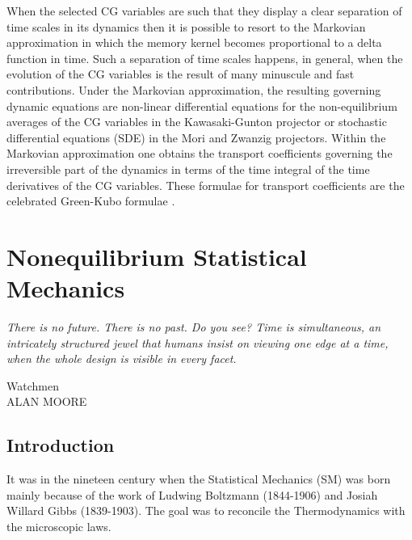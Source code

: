 \documentclass[a4paper,openright,12pt]{book}
\begin{document}
When the  selected CG  variables are  such that  they display  a clear
separation  of time  scales in  its dynamics  then it  is possible  to
resort  to the  Markovian  approximation in  which  the memory  kernel
becomes proportional to  a delta function in time.   Such a separation
of  time scales  happens, in  general, when  the evolution  of the  CG
variables  is the  result of  many minuscule  and fast  contributions.
Under  the Markovian  approximation, the  resulting governing  dynamic
equations    are   non-linear    differential   equations    for   the
non-equilibrium averages  of the  CG variables in  the Kawasaki-Gunton
projector or stochastic  differential equations (SDE) in  the Mori and
Zwanzig projectors.   Within the  Markovian approximation  one obtains
the  transport coefficients  governing  the irreversible  part of  the
dynamics in terms of the time  integral of the time derivatives of the
CG  variables.   These formulae  for  transport  coefficients are  the
celebrated Green-Kubo formulae \cite{Green1952,Kubo1957}.




\chapter{Nonequilibrium Statistical Mechanics}\label{Chap:NESM}
\epigraph{\textit{There is no future. There is no past. Do you see? Time is simultaneous, an intricately structured jewel that humans insist on viewing one edge at a time, when the whole design is visible in every facet.}}{Watchmen \\ ALAN MOORE}

\section{Introduction}
It was in the nineteen century when the Statistical Mechanics (SM) was born mainly because of the work of Ludwing Boltzmann (1844-1906) and Josiah Willard Gibbs (1839-1903). The goal was to reconcile the Thermodynamics with the microscopic laws. 
\end{document}
